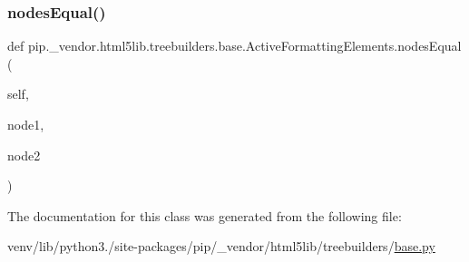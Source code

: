 \subsubsection{\texorpdfstring{nodes\+Equal()}{nodesEqual()}}
{\footnotesize\ttfamily def pip.\+\_\+vendor.\+html5lib.\+treebuilders.\+base.\+Active\+Formatting\+Elements.\+nodes\+Equal (\begin{DoxyParamCaption}\item[{}]{self,  }\item[{}]{node1,  }\item[{}]{node2 }\end{DoxyParamCaption})}



The documentation for this class was generated from the following file\+:\begin{DoxyCompactItemize}
\item 
venv/lib/python3./site-\/packages/pip/\+\_\+vendor/html5lib/treebuilders/\hyperlink{__vendor_2html5lib_2treebuilders_2base_8py}{base.\+py}\end{DoxyCompactItemize}
